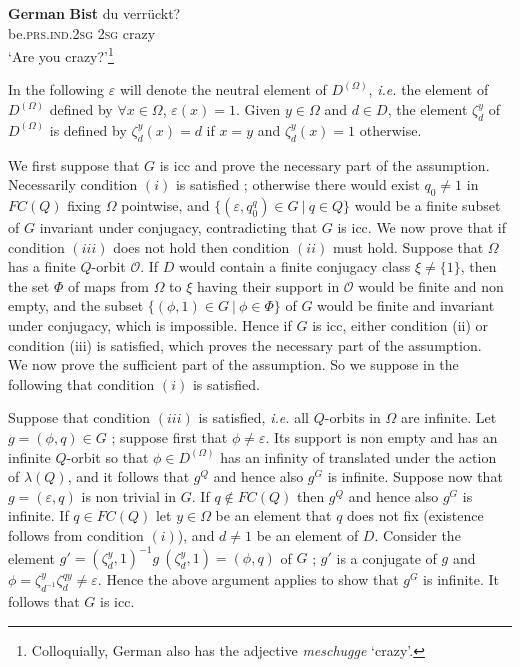 \documentclass[12pt,oneside]{amsart}
\def\e{\varepsilon}
\def\f{\phi}
\def\cal{\mathcal}
\begin{document}
\ea%
    \label{ex:indo:5}
    \textbf{German}
    \gll \textbf{{Bist}} du  verrückt?\\
    be.\textsc{prs.ind}.2\textsc{sg}  2\textsc{sg}  crazy\\
    \glt ‘Are you crazy?’\footnote{Colloquially, German also has the adjective \textit{meschugge} ‘crazy’.}
    \z






 In the following $\e$ will denote the
neutral element of $D^{(\Omega)}$, \emph{i.e.} the element of
$D^{(\Omega)}$ defined by $\forall x\in\Omega$, $\e(x)=1$. Given
$y\in \Omega$ and $d\in D$, the element $\zeta_d^y$ of
$D^{(\Omega)}$ is defined by $\zeta_d^y(x)=d$ if $x=y$ and
$\zeta_d^y(x)=1$ otherwise.


 We first suppose that $G$ is icc and prove the necessary part of the assumption.
 Necessarily condition $(i)$ is satisfied ; otherwise there would exist $q_0\not=1$ in
$FC(Q)$ fixing $\Omega$ pointwise, and $\{(\e,q_0^q)\in G\ |\ q\in
Q\}$ would be a finite subset of $G$ invariant under conjugacy,
contradicting that $G$ is icc. We now prove that if condition
$(iii)$ does not hold then condition $(ii)$ must hold.
%
Suppose  that  $\Omega$ has a finite $Q$-orbit $\cal O$. If $D$
would contain a finite conjugacy class $\xi\not=\{1\}$, then the
set $\Phi$ of maps from $\Omega$ to $\xi$ having their support in
$\cal O$ would be finite and non empty, and the subset
$\{(\f,1)\in G\ |\ \f\in\Phi\}$ of $G$ would be finite and
invariant under conjugacy, which is impossible. Hence if $G$ is
icc, either condition (ii) or condition (iii) is satisfied, which
proves the necessary part of the assumption.\smallskip\\
\indent We now prove the sufficient part of the assumption. So we
suppose in the following that condition $(i)$ is satisfied.

Suppose that condition $(iii)$ is satisfied, \emph{i.e.} all
$Q$-orbits in $\Omega$ are infinite. Let $g=(\f,q)\in G$ ; suppose
first that $\f\not=\e$. Its support is non empty and has an
infinite $Q$-orbit so that $\f\in D^{(\Omega)}$ has an infinity of
translated under the action of $\lambda(Q)$, and it follows that
$g^Q$ and hence also $g^G$ is infinite. Suppose now that
$g=(\e,q)$ is non trivial in $G$. If $q\not\in FC(Q)$ then $g^Q$
and hence also $g^G$ is infinite. If $q\in FC(Q)$ let $y\in\Omega$
be an element that $q$ does not fix (existence follows from
condition $(i)$),  and $d\not=1$ be an element of $D$.
Consider the element $g'=(\zeta_d^y,1)^{-1}g\
(\zeta_d^y,1)=(\phi,q)$ of $G$ ; $g'$ is a conjugate of $g$ and
$\phi=\zeta_{d^{-1}}^y\zeta_d^{qy}\not=\e$. Hence the above
argument applies to show that $g^G$ is infinite. It follows that
$G$ is icc.
\end{document}
